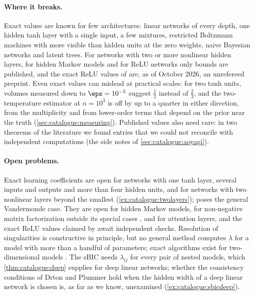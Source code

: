 \begin{refsection}
\paragraph{Where it breaks.} Exact values are known for few architectures: linear networks of every depth, one hidden tanh layer with a single input, a few mixtures, restricted Boltzmann machines with more visible than hidden units at the zero weights, naive Bayesian networks and latent trees. For networks with two or more nonlinear hidden layers, for hidden Markov models and for ReLU networks only bounds are published, and the exact ReLU values of \textcite{Aoyagi2025} are, as of October 2026, an unrefereed preprint. Even exact values can mislead at practical scales: for two tanh units, volumes measured down to $\eps=10^{-5}$ suggest $\frac12$ instead of $\frac23$, and the two-temperature estimator at $n=10^3$ is off by up to a quarter in either direction, from the multiplicity and from lower-order terms that depend on the prior near the truth (\cref{sec:catalogue:measuring}). Published values also need care: in two theorems of the literature we found entries that we could not reconcile with independent computations (the side notes of \cref{sec:catalogue:aoyagi}).

\paragraph{Open problems.} Exact learning coefficients are open for networks with one tanh layer, several inputs and outputs and more than four hidden units, and for networks with two nonlinear layers beyond the smallest (\cref{ex:catalogue:twolayers}); \textcite{Aoyagi2019} poses the general Vandermonde case. They are open for hidden Markov models, for non-negative matrix factorization outside its special cases \parencite{HayashiWatanabe2017a}, and for attention layers, and the exact ReLU values claimed by \textcite{Aoyagi2025} await independent checks. Resolution of singularities is constructive in principle, but no general method computes $\lambda$ for a model with more than a handful of parameters; exact algorithms exist for two-dimensional models \parencite[a preprint]{SergeantPerthuisEtAl2026}. The sBIC needs $\lambda_{ij}$ for every pair of nested models, which \cref{thm:catalogue:deep} supplies for deep linear networks; whether the consistency conditions of Drton and Plummer hold when the hidden width of a deep linear network is chosen is, as far as we know, unexamined (\cref{ex:catalogue:sbicdeep}).


\end{refsection}
